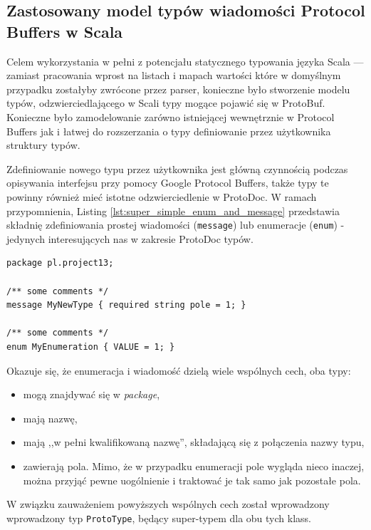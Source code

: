 \documentclass[pdflatex,11pt]{aghdpl}
\begin{document}
\newpage
\subsection{Zastosowany model typów wiadomości Protocol Buffers w Scala}
\label{the_types}
Celem wykorzystania w pełni z potencjału statycznego typowania języka Scala --- zamiast pracowania wprost na listach i mapach wartości które 
w domyślnym przypadku zostałyby zwrócone przez parser, konieczne było stworzenie modelu typów, odzwierciedlającego w Scali typy mogące pojawić się w ProtoBuf.
Konieczne było zamodelowanie zarówno istniejącej wewnętrznie w Protocol Buffers jak i łatwej do rozszerzania o typy definiowanie przez użytkownika struktury typów.

Zdefiniowanie nowego typu przez użytkownika jest główną czynnością podczas opisywania interfejsu przy pomocy Google Protocol Buffers, także typy te powinny
również mieć istotne odzwierciedlenie w ProtoDoc. W ramach przypomnienia, Listing \ref{lst:super_simple_enum_and_message} przedstawia składnię zdefiniowania prostej 
wiadomości (\verb|message|) lub enumeracje (\verb|enum|) - jedynych interesujących nas w zakresie ProtoDoc typów. 

\begin{lstlisting}[caption={Przykład zdefiniowania nowych typów w Protocol Buffers IDL}, label={lst:super_simple_enum_and_message}]
package pl.project13;

/** some comments */
message MyNewType { required string pole = 1; }

/** some comments */
enum MyEnumeration { VALUE = 1; }
\end{lstlisting}

Okazuje się, że enumeracja i wiadomość dzielą wiele wspólnych cech, oba typy:
\begin{itemize}
 \item mogą znajdywać się w \textit{package},
 \item mają nazwę,
 \item mają ,,w pełni kwalifikowaną nazwę'', składającą się z połączenia nazwy typu,
 \item zawierają pola. Mimo, że w przypadku enumeracji pole wygląda nieco inaczej, można przyjąć pewne uogólnienie i traktować je tak samo jak pozostałe pola.
\end{itemize}

W związku zauważeniem powyższych wspólnych cech został wprowadzony wprowadzony typ \verb|ProtoType|, będący super-typem dla obu tych klass.
\end{document}
